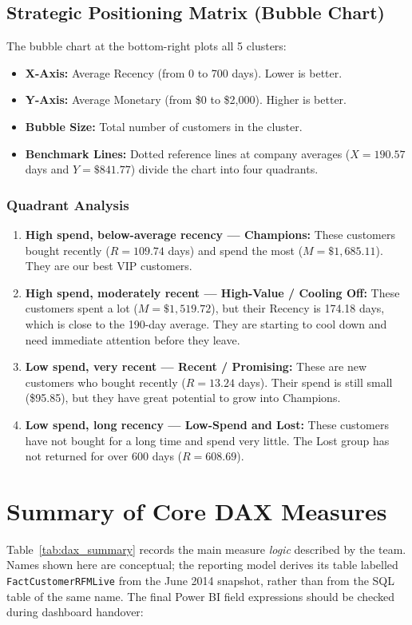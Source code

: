 \subsection{Strategic Positioning Matrix (Bubble Chart)}
\label{subsec:bi_page3_positioning}
The bubble chart at the bottom-right plots all 5 clusters:
\begin{itemize}
    \item \textbf{X-Axis:} Average Recency (from 0 to 700 days). Lower is better.
    \item \textbf{Y-Axis:} Average Monetary (from \$0 to \$2,000). Higher is better.
    \item \textbf{Bubble Size:} Total number of customers in the cluster.
    \item \textbf{Benchmark Lines:} Dotted reference lines at company averages ($X = 190.57$ days and $Y = \$841.77$) divide the chart into four quadrants.
\end{itemize}

\subsubsection{Quadrant Analysis}
\begin{enumerate}
    \item \textbf{High spend, below-average recency --- Champions:}
    These customers bought recently ($R=109.74$ days) and spend the most ($M=\$1,685.11$). They are our best VIP customers.
    \item \textbf{High spend, moderately recent --- High-Value / Cooling Off:}
    These customers spent a lot ($M=\$1,519.72$), but their Recency is 174.18 days, which is close to the 190-day average. They are starting to cool down and need immediate attention before they leave.
    \item \textbf{Low spend, very recent --- Recent / Promising:}
    These are new customers who bought recently ($R=13.24$ days). Their spend is still small (\$95.85), but they have great potential to grow into Champions.
    \item \textbf{Low spend, long recency --- Low-Spend and Lost:}
    These customers have not bought for a long time and spend very little. The Lost group has not returned for over 600 days ($R=608.69$).
\end{enumerate}

\section{Summary of Core DAX Measures}
\label{sec:bi_dax_summary}
Table~\ref{tab:dax_summary} records the main measure \emph{logic} described by the team. Names shown here are conceptual; the reporting model derives its table labelled \texttt{FactCustomerRFMLive} from the June 2014 snapshot, rather than from the SQL table of the same name. The final Power BI field expressions should be checked during dashboard handover:

